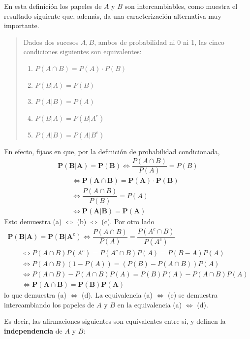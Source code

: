 \documentclass[
  spanish,
  letterpaper,
  DIV=11,
  numbers=noendperiod]{scrreprt}
\providecommand{\tightlist}{%
  \setlength{\itemsep}{0pt}\setlength{\parskip}{0pt}}
\begin{document}
\begin{tcolorbox}
En esta definición los papeles de \(A\) y \(B\) son intercambiables,
como muestra el resultado siguiente que, además, da una caracterización
alternativa muy importante.

\begin{quote}
Dados dos sucesos \(A,B\), ambos de probabilidad ni 0 ni 1, las cinco
condiciones siguientes son equivalentes:

\begin{enumerate}
\def\labelenumi{\alph{enumi}.}
\tightlist
\item
  \(P(A \cap B)=P(A)\cdot P(B)\)
\item
  \(P(B|A)=P(B)\)
\item
  \(P(A|B)=P(A)\)
\item
  \(P(B|A)=P(B|A^c)\)
\item
  \(P(A|B)=P(A|B^c)\)
\end{enumerate}
\end{quote}

En efecto, fijaos en que, por la definición de probabilidad
condicionada, \[
\begin{array}{l}
\mathbf{P(B|A)=P(B)} \Longleftrightarrow \dfrac{P(A\cap B)}{P(A)}=P(B)\\ \qquad \Longleftrightarrow
\mathbf{P(A\cap B)=P(A)\cdot P(B)}
\\ \qquad \Longleftrightarrow \dfrac{P(A\cap B)}{P(B)}=P(A)\\ \qquad \Longleftrightarrow
\mathbf{P(A|B)=P(A)}
\end{array}
\] Esto demuestra (a) \(\Leftrightarrow\) (b) \(\Leftrightarrow\) (c).
Por otro lado \[
\begin{array}{l}
\mathbf{P(B|A)=P(B|A^c)}\Longleftrightarrow \dfrac{P(A\cap B)}{P(A)}=\dfrac{P(A^c\cap B)}{P(A^c)}\\ \qquad \Longleftrightarrow
P(A\cap B)P(A^c)=P(A^c\cap B)P(A)=P(B-A)P(A)\\ \qquad \Longleftrightarrow
P(A\cap B)(1-P(A))=(P(B)-P(A\cap B))P(A)\\ \qquad \Longleftrightarrow
P(A\cap B)-P(A\cap B)P(A)=P(B)P(A)-P(A\cap B)P(A)\\ \qquad \Longleftrightarrow
\mathbf{P(A\cap B)=P(B)P(A)}
\end{array}
\] lo que demuestra (a) \(\Leftrightarrow\) (d). La equivalencia (a)
\(\Leftrightarrow\) (e) se demuestra intercambiando los papeles de \(A\)
y \(B\) en la equivalencia (a) \(\Leftrightarrow\) (d).

Es decir, las afirmaciones siguientes son equivalentes entre si, y
definen la \textbf{independencia} de \(A\) y \(B\):


\end{tcolorbox}
\end{document}
